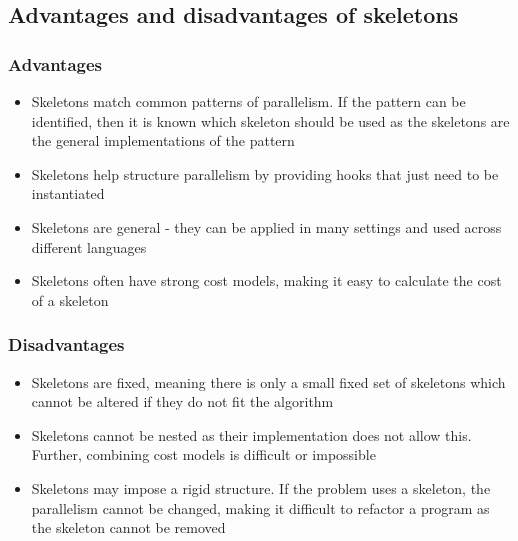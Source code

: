 \documentclass[CS4204-Notes.tex]{subfiles}
\begin{document}
\subsection{Advantages and disadvantages of skeletons}
\subsubsection{Advantages}
\begin{itemize}
\item Skeletons match common patterns of parallelism. If the pattern can be identified, then it is known which skeleton should be used as the skeletons are the general implementations of the pattern
\item Skeletons help structure parallelism by providing hooks that just need to be instantiated
\item Skeletons are general - they can be applied in many settings and used across different languages
\item Skeletons often have strong cost models, making it easy to calculate the cost of a skeleton
\end{itemize}
\subsubsection{Disadvantages}
\begin{itemize}
\item Skeletons are fixed, meaning there is only a small fixed set of skeletons which cannot be altered if they do not fit the algorithm
\item Skeletons cannot be nested as their implementation does not allow this. Further, combining cost models is difficult or impossible
\item Skeletons may impose a rigid structure. If the problem uses a skeleton, the parallelism cannot be changed, making it difficult to refactor a program as the skeleton cannot be removed
\end{itemize}
\end{document}
